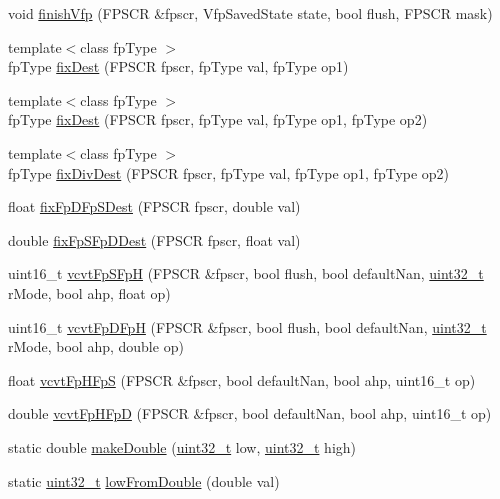 \begin{DoxyCompactItemize}
\item 
void \hyperlink{namespaceArmISA_abffe14667f17b8a2608a78d40163800c}{finishVfp} (FPSCR \&fpscr, VfpSavedState state, bool flush, FPSCR mask)
\item 
{\footnotesize template$<$class fpType $>$ }\\fpType \hyperlink{namespaceArmISA_ac239772262541bc963f961d90179ee89}{fixDest} (FPSCR fpscr, fpType val, fpType op1)
\item 
{\footnotesize template$<$class fpType $>$ }\\fpType \hyperlink{namespaceArmISA_a8b64a4b5487a8af272ec369378bf173a}{fixDest} (FPSCR fpscr, fpType val, fpType op1, fpType op2)
\item 
{\footnotesize template$<$class fpType $>$ }\\fpType \hyperlink{namespaceArmISA_ad729dc35a47c59e5026ecd7b9d3f4000}{fixDivDest} (FPSCR fpscr, fpType val, fpType op1, fpType op2)
\item 
float \hyperlink{namespaceArmISA_aaf84dfd3913c28b6b694fc86d2bd038a}{fixFpDFpSDest} (FPSCR fpscr, double val)
\item 
double \hyperlink{namespaceArmISA_ab2a1dfd17c29ec59dbce62ad9f84d0b4}{fixFpSFpDDest} (FPSCR fpscr, float val)
\item 
uint16\_\-t \hyperlink{namespaceArmISA_adb67204f8d538085358862455328e05f}{vcvtFpSFpH} (FPSCR \&fpscr, bool flush, bool defaultNan, \hyperlink{Type_8hh_a435d1572bf3f880d55459d9805097f62}{uint32\_\-t} rMode, bool ahp, float op)
\item 
uint16\_\-t \hyperlink{namespaceArmISA_ab8eea489f30b26880ed42148bbd0f26e}{vcvtFpDFpH} (FPSCR \&fpscr, bool flush, bool defaultNan, \hyperlink{Type_8hh_a435d1572bf3f880d55459d9805097f62}{uint32\_\-t} rMode, bool ahp, double op)
\item 
float \hyperlink{namespaceArmISA_ab2a3f2ebd193d8c4b5a8ba890292a3f7}{vcvtFpHFpS} (FPSCR \&fpscr, bool defaultNan, bool ahp, uint16\_\-t op)
\item 
double \hyperlink{namespaceArmISA_a348655852aed3e6d37ce1c434836b6d1}{vcvtFpHFpD} (FPSCR \&fpscr, bool defaultNan, bool ahp, uint16\_\-t op)
\item 
static double \hyperlink{namespaceArmISA_af137cb7ee089dc64b0a2fe0134301e3b}{makeDouble} (\hyperlink{Type_8hh_a435d1572bf3f880d55459d9805097f62}{uint32\_\-t} low, \hyperlink{Type_8hh_a435d1572bf3f880d55459d9805097f62}{uint32\_\-t} high)
\item 
static \hyperlink{Type_8hh_a435d1572bf3f880d55459d9805097f62}{uint32\_\-t} \hyperlink{namespaceArmISA_abe3eb6506a3b096d7c74162d3e32c3a4}{lowFromDouble} (double val)

\end{DoxyCompactItemize}
